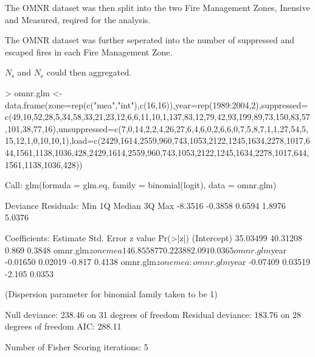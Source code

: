 \documentclass{article}
\begin{document}
\begin{spacing}{1.5}
\noindent The OMNR dataset was then split into the two Fire Management Zones, Inensive and Measured, reqired for the analysis.


\noindent The OMNR dataset was further seperated into the number of suppressed and escaped fires in each Fire Management Zone.


\noindent $N_{\mathrm{s}}$ and $N_{\mathrm{e}}$ could then aggregated.



\begin{Schunk}
\begin{Sinput}
> omnr.glm <- data.frame(zone=rep(c("mea","int"),c(16,16)),year=rep(1989:2004,2),suppressed=c(49,10,52,28,5,34,58,33,21,23,12,6,6,11,10,1,137,83,12,79,42,93,199,89,73,150,83,57,101,38,77,16),unsuppressed=c(7,0,14,2,2,4,26,27,6,4,6,0,2,6,6,0,7,5,8,7,1,1,27,54,5,15,12,1,0,10,10,1),load=c(2429,1614,2559,960,743,1053,2122,1245,1634,2278,1017,644,1561,1138,1036,428,2429,1614,2559,960,743,1053,2122,1245,1634,2278,1017,644,1561,1138,1036,428))
\end{Sinput}
\end{Schunk}

\begin{Schunk}
\begin{Soutput}
Call:
glm(formula = glm.eq, family = binomial(logit), data = omnr.glm)

Deviance Residuals: 
    Min       1Q   Median       3Q      Max  
-8.3516  -0.3858   0.6594   1.8976   5.0376  

Coefficients:
                                Estimate Std. Error z value Pr(>|z|)
(Intercept)                     35.03499   40.31208   0.869   0.3848
omnr.glm$zonemea               146.85587   70.22388   2.091   0.0365
omnr.glm$year                   -0.01650    0.02019  -0.817   0.4138
omnr.glm$zonemea:omnr.glm$year  -0.07409    0.03519  -2.105   0.0353

(Dispersion parameter for binomial family taken to be 1)

    Null deviance: 238.46  on 31  degrees of freedom
Residual deviance: 183.76  on 28  degrees of freedom
AIC: 288.11

Number of Fisher Scoring iterations: 5
\end{Soutput}
\end{Schunk}


\end{spacing}
\end{document}
